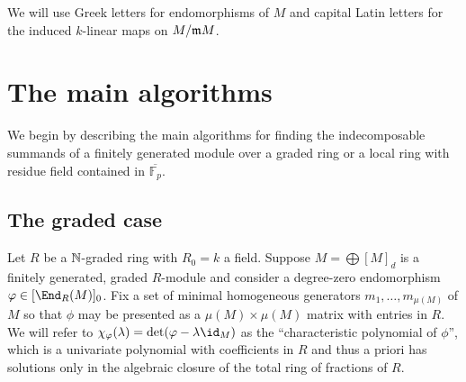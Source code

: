 \documentclass[12pt]{article}
\def\FF{\mathbb F}
\theoremstyle{theorem}
\numberwithin{thm}{section}
\theoremstyle{definition}
\begin{document}
We will use Greek letters for endomorphisms of $M$ and capital Latin letters for the induced $k$-linear maps on $M/\mathfrak m M$.

\section{The main algorithms}

We begin by describing the main algorithms for finding the indecomposable summands of a finitely generated module over a graded ring or a local ring with residue field contained in $\overline{\FF_p}$.

\subsection{The graded case}\label{sec:graded-alg}

Let $R$ be a $\mathbb N$-graded ring with $R_0 = k$ a field. Suppose $M = \bigoplus [M]_d$ is a finitely generated, graded $R$-module and consider a  degree-zero endomorphism $\phi \in [\End_R(M)]_0$. Fix a set of minimal homogeneous generators $m_1,\dots,m_{\mu(M)}$ of $M$ so that $\phi$ may be presented as a $\mu(M)\times\mu(M)$ matrix with entries in $R$. We will refer to $\chi_\phi(\lambda) = \det(\phi-\lambda\id_M)$ as the ``characteristic polynomial of $\phi$'', which is a univariate polynomial with coefficients in $R$ and thus a priori has solutions only in the algebraic closure of the total ring of fractions of $R$.
\end{document}
